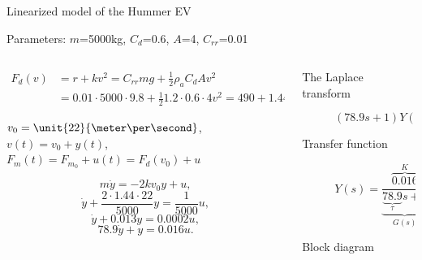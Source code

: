 \documentclass[dvisvgm,hypertex,aspectratio=169]{beamer}
\begin{document}
    \begin{frame}[label=L3]{Linearized model of the Hummer EV}

    \footnotesize

    Parameters: $m$=5000kg, $C_d$=0.6, $A$=\unit{4}{\meter\squared}, $C_{rr}$=0.01

  \begin{columns}
    \begin{column}{0.6\linewidth}

      \begin{align*}
        F_d(v) &= r + kv^2 = C_{rr}mg + \frac{1}{2}\rho_a C_d A v^2\\
               &= 0.01\cdot 5000\cdot9.8 + \frac{1}{2}1.2\cdot 0.6\cdot 4 v^2 = 490 + 1.44v^2.
      \end{align*}
      
      \begin{description}
        \pause
      \item[Operating point and deviation variables]
        $v_0 = \unit{22}{\meter\per\second}$, $v(t)=v_0 + y(t)$, $F_m(t) = F_{m_0} + u(t) = F_d(v_0) + u$ 
        \pause
      \item[Linearized ODE]
    \[m\dot{y} = -2kv_0y + u,\]
    \[ \dot{y} + \frac{2\cdot 1.44\cdot 22}{5000} y = \frac{1}{5000} u, \]
    \[ \dot{y} + 0.013 y = 0.0002u, \]
    \[ 78.9\dot{y} + y = 0.016u. \]
        \pause
  \end{description}
\end{column}
\begin{column}{0.4\linewidth}
  \begin{description}
  \item[The Laplace transform]
    \[ (78.9s + 1) Y(s) = 0.016 U(s) \]
        \pause
  \item[Transfer function]
    \[  Y(s) = \underbrace{\frac{\overbrace{0.016}^K}{ \underbrace{78.9}_\tau s + 1}}_{G(s)} U(s) \]

        \pause
  \item[Block diagram]
\end{description}
\end{column}
\end{columns}
\end{frame}
\end{document}
